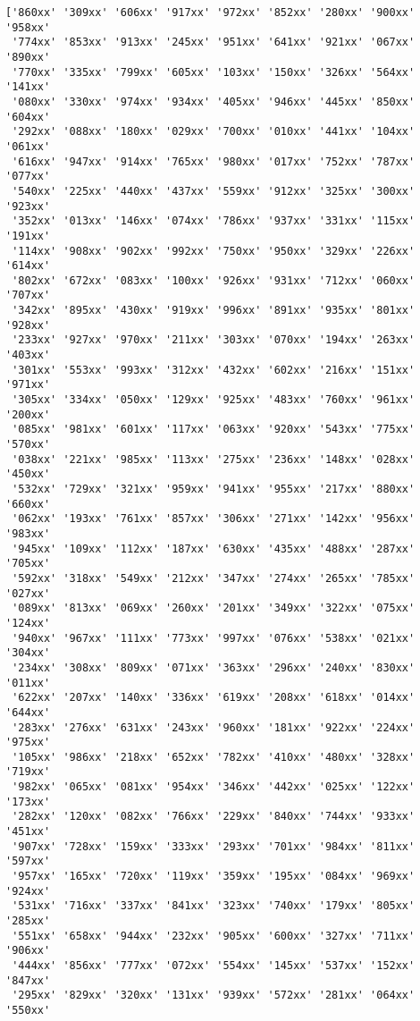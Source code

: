 \documentclass[11pt]{article}
\begin{document}
    \begin{Verbatim}[commandchars=\\\{\}]
['860xx' '309xx' '606xx' '917xx' '972xx' '852xx' '280xx' '900xx' '958xx'
 '774xx' '853xx' '913xx' '245xx' '951xx' '641xx' '921xx' '067xx' '890xx'
 '770xx' '335xx' '799xx' '605xx' '103xx' '150xx' '326xx' '564xx' '141xx'
 '080xx' '330xx' '974xx' '934xx' '405xx' '946xx' '445xx' '850xx' '604xx'
 '292xx' '088xx' '180xx' '029xx' '700xx' '010xx' '441xx' '104xx' '061xx'
 '616xx' '947xx' '914xx' '765xx' '980xx' '017xx' '752xx' '787xx' '077xx'
 '540xx' '225xx' '440xx' '437xx' '559xx' '912xx' '325xx' '300xx' '923xx'
 '352xx' '013xx' '146xx' '074xx' '786xx' '937xx' '331xx' '115xx' '191xx'
 '114xx' '908xx' '902xx' '992xx' '750xx' '950xx' '329xx' '226xx' '614xx'
 '802xx' '672xx' '083xx' '100xx' '926xx' '931xx' '712xx' '060xx' '707xx'
 '342xx' '895xx' '430xx' '919xx' '996xx' '891xx' '935xx' '801xx' '928xx'
 '233xx' '927xx' '970xx' '211xx' '303xx' '070xx' '194xx' '263xx' '403xx'
 '301xx' '553xx' '993xx' '312xx' '432xx' '602xx' '216xx' '151xx' '971xx'
 '305xx' '334xx' '050xx' '129xx' '925xx' '483xx' '760xx' '961xx' '200xx'
 '085xx' '981xx' '601xx' '117xx' '063xx' '920xx' '543xx' '775xx' '570xx'
 '038xx' '221xx' '985xx' '113xx' '275xx' '236xx' '148xx' '028xx' '450xx'
 '532xx' '729xx' '321xx' '959xx' '941xx' '955xx' '217xx' '880xx' '660xx'
 '062xx' '193xx' '761xx' '857xx' '306xx' '271xx' '142xx' '956xx' '983xx'
 '945xx' '109xx' '112xx' '187xx' '630xx' '435xx' '488xx' '287xx' '705xx'
 '592xx' '318xx' '549xx' '212xx' '347xx' '274xx' '265xx' '785xx' '027xx'
 '089xx' '813xx' '069xx' '260xx' '201xx' '349xx' '322xx' '075xx' '124xx'
 '940xx' '967xx' '111xx' '773xx' '997xx' '076xx' '538xx' '021xx' '304xx'
 '234xx' '308xx' '809xx' '071xx' '363xx' '296xx' '240xx' '830xx' '011xx'
 '622xx' '207xx' '140xx' '336xx' '619xx' '208xx' '618xx' '014xx' '644xx'
 '283xx' '276xx' '631xx' '243xx' '960xx' '181xx' '922xx' '224xx' '975xx'
 '105xx' '986xx' '218xx' '652xx' '782xx' '410xx' '480xx' '328xx' '719xx'
 '982xx' '065xx' '081xx' '954xx' '346xx' '442xx' '025xx' '122xx' '173xx'
 '282xx' '120xx' '082xx' '766xx' '229xx' '840xx' '744xx' '933xx' '451xx'
 '907xx' '728xx' '159xx' '333xx' '293xx' '701xx' '984xx' '811xx' '597xx'
 '957xx' '165xx' '720xx' '119xx' '359xx' '195xx' '084xx' '969xx' '924xx'
 '531xx' '716xx' '337xx' '841xx' '323xx' '740xx' '179xx' '805xx' '285xx'
 '551xx' '658xx' '944xx' '232xx' '905xx' '600xx' '327xx' '711xx' '906xx'
 '444xx' '856xx' '777xx' '072xx' '554xx' '145xx' '537xx' '152xx' '847xx'
 '295xx' '829xx' '320xx' '131xx' '939xx' '572xx' '281xx' '064xx' '550xx'

\end{Verbatim}
\end{document}

